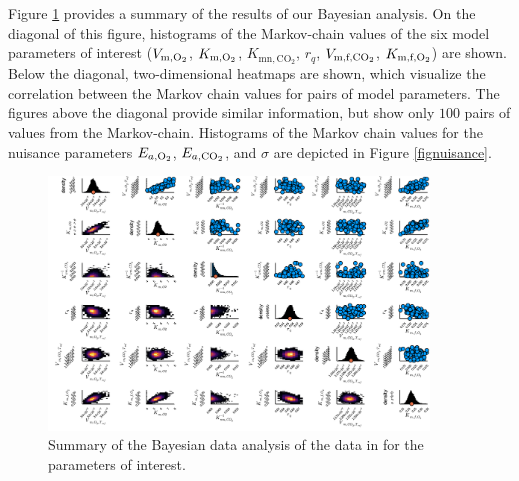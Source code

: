 \\
\\
Figure \ref{figprior} provides a summary of the results of our Bayesian analysis. On the diagonal of this figure, histograms of the Markov-chain values of the six model parameters of interest ($V_{\text{m},\text{O}_2}$, $K_{\text{m},\text{O}_2}$, $K_{\text{mn},\text{CO}_2}$, $r_q$, $V_{\text{m,f,}\text{CO}_2}$, $K_{\text{m,f},\text{O}_2}$) are shown. Below the diagonal, two-dimensional heatmaps are shown, which visualize the correlation between the Markov chain values for pairs of model parameters. The figures above the diagonal provide similar information, but show only $100$ pairs of values from the Markov-chain. Histograms of the Markov chain values for the nuisance parameters $E_{a,\text{O}_2}$, $E_{a,\text{CO}_2}$, and $\sigma$ are depicted in Figure \ref{fignuisance}.
\begin{figure}
	\centering
	\includegraphics[width=0.9\textwidth]{figure/paper 2/test.pdf}
	\caption{Summary of the Bayesian data analysis of the data in \textcite{ho} for the parameters of interest.}
	\label{figprior}
\end{figure}
\clearpage
